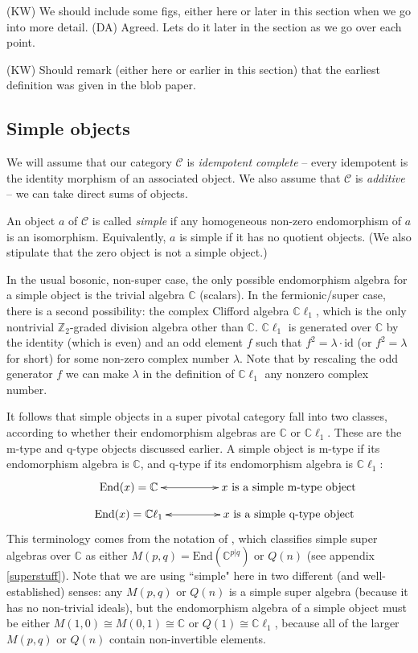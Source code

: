 \documentclass[12pt,a4paper]{article}
\newcommand{\cc}{\mathbb{C}}
\newcommand{\mcc}{\mathcal{C}}
\newcommand{\zt}{\mathbb{Z}_2}
\newcommand{\id}{\text{id}}
\newcommand{\End}{\text{End}}
\newcommand{\cl}{\mathbb{C}\ell}
\newcommand{\kw}[1]{{\color{kwcolor}\footnotesize{(KW) #1}}}
\newcommand{\dave}[1]{{\color{ao(english)}\footnotesize{(DA) #1}}}
\begin{document}
\kw{We should include some figs, either here or later in this section when we go into more detail.}
\dave{Agreed. Lets do it later in the section as we go over each point.}

\kw{Should remark (either here or earlier in this section) that the earliest definition was given in the blob paper.}




\subsection{Simple objects}  \label{def_sob_ss}

We will assume that our category $\mcc$ is {\it idempotent complete} -- 
every idempotent is the identity morphism of an associated object.
We also assume that $\mcc$ is {\it additive} -- we can take direct sums of objects.

An object $a$ of $\mcc$ is called {\it simple} if any homogeneous non-zero endomorphism of $a$ is an isomorphism.
Equivalently, $a$ is simple if it has no quotient objects.
(We also stipulate that the zero object is not a simple object.)

In the usual bosonic, non-super case, the only possible endomorphism algebra for a simple object
is the trivial algebra $\cc$ (scalars).
In the fermionic/super case, there is a second possibility: the complex Clifford algebra $\cl_1$, 
which is the only nontrivial $\zt$-graded division algebra other than $\cc$.
$\cl_1$ is generated over $\cc$ by the identity (which is even) and an odd element $f$ such that $f^2 = \lambda \cdot \id$
(or $f^2 = \lambda$ for short) for some non-zero complex number $\lambda$. 
Note that by rescaling the odd generator $f$ we can make $\lambda$ in the definition of $\cl_1$ any nonzero complex number. 

It follows that simple objects in a super pivotal category fall into two classes, according to whether their endomorphism algebras are $\cc$ or $\cl_1$. 
These are the m-type and q-type objects discussed earlier. 
A simple object is {m-type} if its endomorphism algebra
is $\cc$, and {q-type} if its endomorphism algebra is $\cl_1$:
\begin{align}
\vcenter{\xymatrix @!0 @M=1mm @C=25mm{
& \text{End}(x) = \mathbb{C} \ar@{<->}[rr] &   &\text{$x$ is a simple m-type object}&  \\
&\text{End}(x) = \mathbb{C} \ell_1 \ar@{<->}[rr]  &  &\text{$x$ is a simple q-type object}&
	}}
\end{align}
This terminology comes from the notation of \cite{jozefiak1988}, which classifies simple super algebras over $\cc$ as either
$M(p,q) = \End(\cc^{p|q})$ or $Q(n)$ (see appendix \ref{superstuff}).
Note that we are using ``simple" here in two different (and well-established) senses: 
any $M(p,q)$ or $Q(n)$ is a simple super algebra
(because it has no non-trivial ideals), but the endomorphism algebra of a simple object must be either
$M(1,0) \cong M(0,1) \cong \cc$ or $Q(1) \cong \cl_1$,
because all of the larger $M(p,q)$ or $Q(n)$ contain non-invertible elements.
\end{document}

